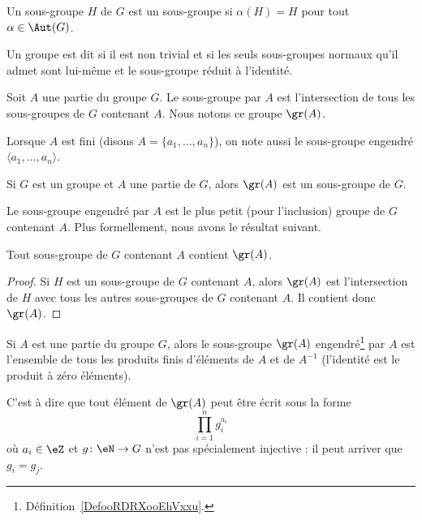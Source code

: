 \begin{definition}      \label{DEFooUXXTooCCLmQe}
    Un sous-groupe \( H\) de \( G\) est un sous-groupe  si \( \alpha(H)=H\) pour tout \( \alpha\in \Aut(G)\).
\end{definition}

\begin{definition}   \label{DefGroupeSimple}
    Un groupe est dit  si il est non trivial et si les seuls sous-groupes normaux qu'il admet sont lui-même et le sous-groupe réduit à l'identité.
\end{definition}

\begin{definition}        \label{DefooRDRXooEhVxxu}
    Soit \( A\) une partie du groupe \( G\). Le sous-groupe  par \( A\) est l'intersection de tous les sous-groupes de \( G\) contenant \( A\). Nous notons ce groupe \( \gr(A)\).

    Lorsque \( A \) est fini (disons \( A = \{a_1, \dots, a_n\} \)), on note aussi le sous-groupe engendré \( \langle a_1, \dots, a_n \rangle \).
\end{definition}

\begin{lemma}
    Si \( G\) est un groupe et \( A\) une partie de \( G\), alors \( \gr(A)\) est un sous-groupe de \( G\).
\end{lemma}

Le sous-groupe engendré par \( A \) est le plus petit (pour l'inclusion) groupe de \( G\) contenant \( A\). Plus formellement, nous avons le résultat suivant.
\begin{lemma}
    Tout sous-groupe de \( G\) contenant \( A\) contient \( \gr(A)\).
\end{lemma}

\begin{proof}
    Si \( H\) est un sous-groupe de \( G\) contenant \( A\), alors \( \gr(A)\) est l'intersection de \( H\) avec tous les autres sous-groupes de \( G\) contenant \( A\). Il contient donc \( \gr(A)\).
\end{proof}

\begin{lemma}   \label{LemFUIZooBZTCiy}
    Si \( A\) est une partie du groupe \( G\), alors le sous-groupe \( \gr(A)\) engendré\footnote{Définition~\ref{DefooRDRXooEhVxxu}.} par \( A\) est l'ensemble de tous les produits finis d'éléments de \( A\) et de \( A^{-1}\) (l'identité est le produit à zéro éléments).

    C'est à dire que tout élément de \( \gr(A)\) peut être écrit sous la forme
    \begin{equation}
        \prod_{i=1}^ng_i^{a_i}
    \end{equation}
    où \( a_i\in \eZ\) et \( g\colon \eN\to G\) n'est pas spécialement injective : il peut arriver que \( g_i=g_j\).
\end{lemma}


